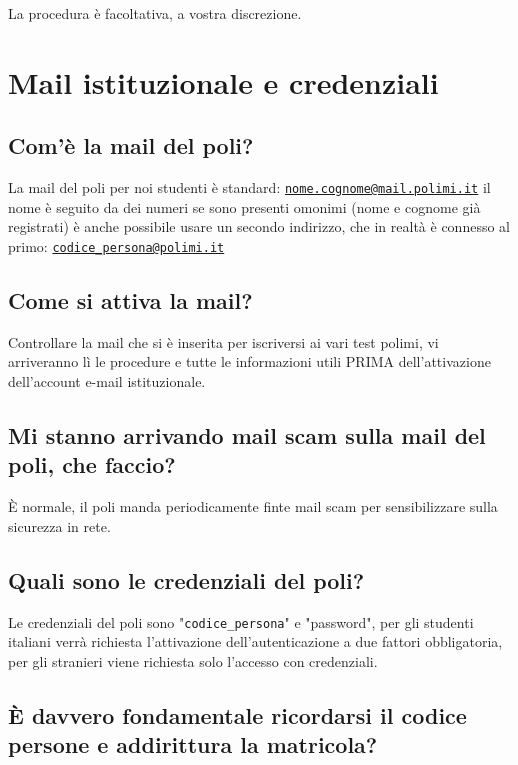 \documentclass[legal]{polinetwork}
\begin{document}
La procedura è facoltativa, a vostra discrezione.

\section{Mail istituzionale e credenziali}


\subsection{Com'è la mail del poli?}


La mail del poli per noi studenti è standard: \href{mailto:nome.cognome@mail.polimi.it}{\texttt{nome.cognome@mail.polimi.it}} il nome è seguito da dei numeri se sono presenti omonimi (nome e cognome già registrati) è anche possibile usare un secondo indirizzo, che in realtà è connesso al primo: \href{mailto:codice_persona@polimi.it}{\texttt{codice\_persona@polimi.it}}

\subsection{Come si attiva la mail?}


Controllare la mail che si è inserita per iscriversi ai vari test polimi, vi arriveranno lì le procedure e tutte le informazioni utili PRIMA dell'attivazione dell'account e-mail istituzionale.


\subsection{Mi stanno arrivando mail scam sulla mail del poli, che faccio?}


È normale, il poli manda periodicamente finte mail scam per sensibilizzare sulla sicurezza in rete.

\subsection{Quali sono le credenziali del poli?}


Le credenziali del poli sono "\texttt{codice\_persona}" e "password", per gli studenti italiani verrà richiesta l'attivazione dell'autenticazione a due fattori obbligatoria, per gli stranieri viene richiesta solo l'accesso con credenziali.

\subsection{È davvero fondamentale ricordarsi il codice persone e addirittura la matricola?}
\end{document}
